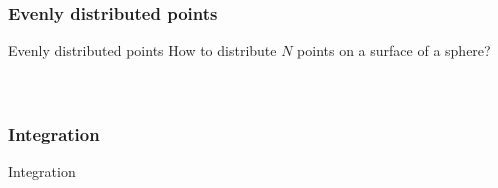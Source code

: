 \documentclass{beamer}
\begin{document}
\subsubsection{Evenly distributed points}
\begin{frame}{Evenly distributed points}
    \centering
    How to distribute $N$ points on a surface of a sphere?\\ ~\\ ~\\
    \raggedright
	
\end{frame}

\subsubsection{Integration}
\begin{frame}{Integration}
\end{frame}
\end{document}
